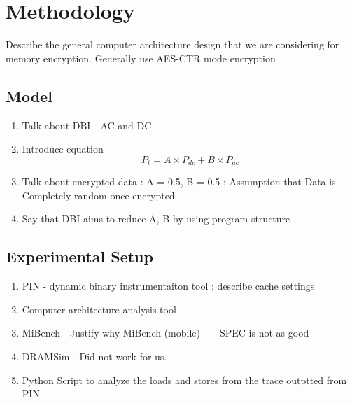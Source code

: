 \section{Methodology}
\label{sec-methodology}

Describe the general computer architecture design that we are considering for
memory encryption. Generally use AES-CTR mode encryption

\subsection{Model}

\begin{enumerate}
  \item Talk about DBI - AC and DC 
  \item Introduce equation
    $$ P_t = A \times P_{dc} + B \times P_{ac}$$
  \item Talk about encrypted data : A = 0.5, B = 0.5 : Assumption that Data is
    Completely random once encrypted
  \item Say that DBI aims to reduce A, B by using program structure
\end{enumerate}

\subsection{Experimental Setup}
\begin{enumerate}
  \item PIN - dynamic binary instrumentaiton tool : describe cache settings
  \item Computer architecture analysis tool
  \item MiBench - Justify why MiBench (mobile) ---- SPEC is not as good
  \item DRAMSim - Did not work for us.
  \item Python Script to analyze the loads and stores from the trace outptted
    from PIN
\end{enumerate}

